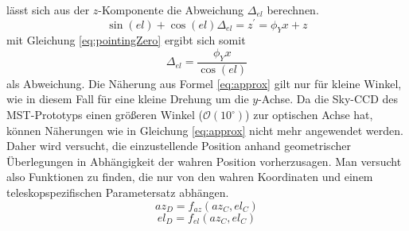 lässt sich aus der $z$-Komponente die Abweichung $\Delta_{el}$ berechnen.
\begin{equation}
\sin(el)+\cos(el)\Delta_{el}=z^{\prime}=\phi_Yx+z
\end{equation}
mit Gleichung \ref{eq:pointingZero} ergibt sich somit 
\begin{equation}
\Delta_{el}=\frac{\phi_Yx}{\cos(el)}
\end{equation}
als Abweichung. Die Näherung aus Formel \ref{eq:approx} gilt nur für kleine Winkel, wie in diesem Fall für eine kleine Drehung um die $y$-Achse.
Da die Sky-CCD des MST-Prototyps einen größeren Winkel ($\mathcal{O}\left(10^{\circ}\right)$) zur optischen Achse hat, können Näherungen wie in Gleichung \ref{eq:approx} nicht mehr angewendet werden. Daher wird versucht, die einzustellende Position anhand geometrischer Überlegungen in Abhängigkeit der wahren Position vorherzusagen. Man versucht also Funktionen zu finden, die nur von den wahren Koordinaten und einem teleskopspezifischen Parametersatz abhängen.
\begin{equation} 
az_D=f_{az}(az_C,el_C)
\end{equation}
\begin{equation}
el_D=f_{el}(az_C,el_C)
\label{eq:pointingprinciple}
\end{equation}

